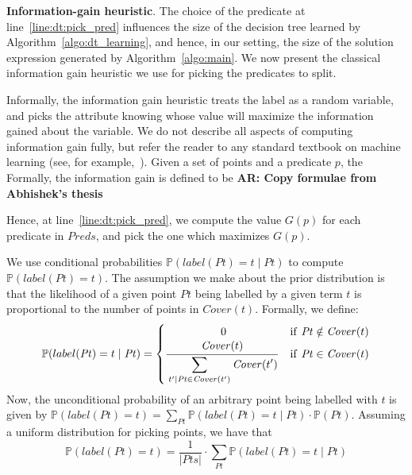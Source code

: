 \documentclass{llncs}
\newcommand\arsays[1]{{\bf AR: #1}}
\newcommand\Points{\mathit{Pts}}
\newcommand\Point{\mathit{Pt}}
\newcommand\Predicates{\mathit{Preds}}
\newcommand\Pred{p}
\newcommand\Term{t}
\newcommand\Cover{\mathit{Cover}}
\newcommand\Prob[1]{\mathbb{P}(#1)}
\renewcommand{\paragraph}[1]{\par\noindent\textbf{#1}.}
\begin{document}
\paragraph{Information-gain heuristic}
The choice of the predicate at line~\ref{line:dt:pick_pred} influences
the size of the decision tree learned by
Algorithm~\ref{algo:dt_learning}, and hence, in our setting, the size of
the solution expression generated by Algorithm~\ref{algo:main}.
We now present the classical information gain heuristic we use for
picking the predicates to split.

Informally, the information gain heuristic treats the label as a random
variable, and picks the attribute knowing whose value will maximize the
information gained about the variable.
We do not describe all aspects of computing information gain fully, but
refer the reader to any standard textbook on machine learning (see, for
example,~\cite{bishop-book}).
Given a set of points and a predicate $\Pred$, the
Formally, the information gain is defined to be
\arsays{Copy formulae from Abhishek's thesis}

Hence, at line~\ref{line:dt:pick_pred}, we compute the value $G(\Pred)$
for each predicate in $\Predicates$, and pick the one which maximizes
$G(\Pred)$.

We use conditional probabilities $\Prob{label(\Point) = \Term \mid
\Point}$ to compute $\Prob{label(\Point) = t}$.
The assumption we make about the prior distribution is that the
likelihood of a given point $\Point$ being labelled by a given term
$\Term$ is proportional to the number of points in $\Cover(\Term)$.
Formally, we define:
\[
    \Prob{label(\Point) = t \mid \Point} =
    \begin{cases}
        \qquad\qquad\quad 0  & \mathrm{if}\ \Point \notin \Cover(\Term)\\
      \displaystyle
      \frac{\strut\displaystyle\Cover(\Term)}{\strut\displaystyle\sum_{\Term'
          | \Point \in \Cover(\Term')} \Cover(\Term') } & \mathrm{if}\ \Point \in \Cover(\Term) \\
    \end{cases}
\]
Now, the unconditional probability of an arbitrary point being labelled
with $\Term$ is given by $\Prob{label(\Point) = \Term} = \sum_{\Point}
\Prob{label(\Point) = \Term \mid \Point}\cdot\Prob{\Point}$.
Assuming a uniform distribution for picking points, we have that
\[
    \Prob{label(\Point) = t} =  \frac{1}{\vert \Points \vert} \cdot \sum_{\Point} \Prob{label(\Point) = \Term \mid \Point}
\]
\end{document}

